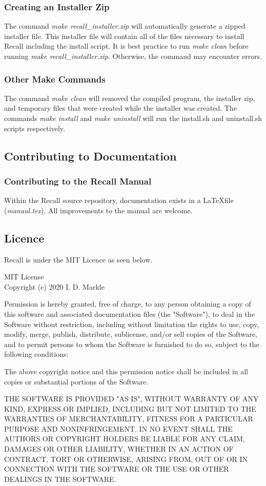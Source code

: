 \documentclass[letterpaper]{article}
\begin{document}
\subsubsection{Creating an Installer Zip}
The command \textit{make recall\_installer.zip} will automatically generate a zipped installer file. This installer file will contain all of the files necessary to install Recall including the install script. It is best practice to run \textit{make clean} before running \textit{make recall\_installer.zip}. Otherwise, the command may encounter errors.

\subsubsection{Other Make Commands}
The command \textit{make clean} will removed the compiled program, the installer zip, and temporary files that were created while the installer was created. The commands \textit{make install} and \textit{make uninstall} will run the install.sh and uninstall.sh scripts respectively.

\subsection{Contributing to Documentation}
\subsubsection{Contributing to the Recall Manual} \label{manual.tex}
Within the Recall source repository, documentation exists in a \LaTeX file (\textit{manaul.tex}). All improvements to the manual are welcome.

\subsection{Licence} \label{licence}
Recall is under the MIT Licence as seen below.\\
\begin{center}
MIT License\\
Copyright (c) 2020 I. D. Markle
\end{center}

Permission is hereby granted, free of charge, to any person obtaining a copy of this software and associated documentation files (the "Software"), to deal in the Software without restriction, including without limitation the rights to use, copy, modify, merge, publish, distribute, sublicense, and/or sell
copies of the Software, and to permit persons to whom the Software is furnished to do so, subject to the following conditions:

The above copyright notice and this permission notice shall be included in all copies or substantial portions of the Software.

THE SOFTWARE IS PROVIDED "AS IS", WITHOUT WARRANTY OF ANY KIND, EXPRESS OR IMPLIED, INCLUDING BUT NOT LIMITED TO THE WARRANTIES OF MERCHANTABILITY, FITNESS FOR A PARTICULAR PURPOSE AND NONINFRINGEMENT. IN NO EVENT SHALL THE AUTHORS OR COPYRIGHT HOLDERS BE LIABLE FOR ANY CLAIM, DAMAGES OR OTHER
LIABILITY, WHETHER IN AN ACTION OF CONTRACT, TORT OR OTHERWISE, ARISING FROM, OUT OF OR IN CONNECTION WITH THE SOFTWARE OR THE USE OR OTHER DEALINGS IN THE SOFTWARE.
\end{document}

